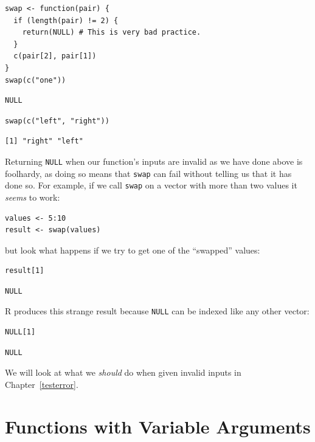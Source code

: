 \begin{lstlisting}
swap <- function(pair) {
  if (length(pair) != 2) {
    return(NULL) # This is very bad practice.
  }
  c(pair[2], pair[1])
}
swap(c("one"))
\end{lstlisting}

\begin{lstlisting}
NULL
\end{lstlisting}

\begin{lstlisting}
swap(c("left", "right"))
\end{lstlisting}

\begin{lstlisting}
[1] "right" "left" 
\end{lstlisting}

Returning \texttt{NULL} when our function's inputs are invalid as we have done above is foolhardy,
as doing so means that \texttt{swap} can fail without telling us that it has done so.
For example,
if we call \texttt{swap} on a vector with more than two values
it \emph{seems} to work:

\begin{lstlisting}
values <- 5:10
result <- swap(values)
\end{lstlisting}

\noindent
but look what happens if we try to get one of the ``swapped'' values:

\begin{lstlisting}
result[1]
\end{lstlisting}

\begin{lstlisting}
NULL
\end{lstlisting}

\noindent
R produces this strange result because \texttt{NULL}
can be indexed like any other vector:

\begin{lstlisting}
NULL[1]
\end{lstlisting}

\begin{lstlisting}
NULL
\end{lstlisting}

We will look at what we \emph{should} do when given invalid inputs in Chapter~\ref{testerror}.

\section{Functions with Variable Arguments}

